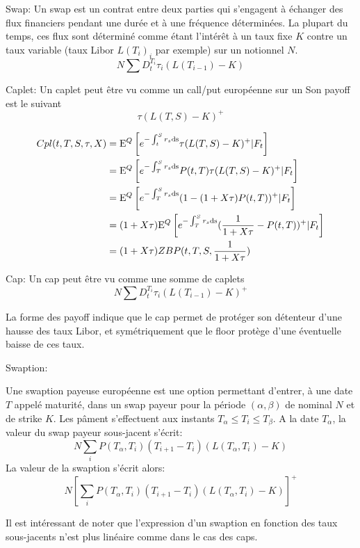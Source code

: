 \begin{defn}
  Swap:
Un swap est un contrat entre deux parties qui s'engagent à échanger des flux financiers pendant une durée et à une fréquence déterminées. La plupart du temps, ces flux sont déterminé comme étant l'intérêt à un taux fixe $K$ contre un taux variable (taux Libor ${L(T_i)}_i$ par exemple) sur un notionnel $N$. 
$$ N \sum D_t^{T_i} \tau_i (L(T_{i-1}) - K) $$
\end{defn}


\begin{defn}
  Caplet:
  Un caplet peut être vu comme un call/put européenne sur un
  Son payoff est le suivant
$$ \tau (L(T, S) - K)^+ $$
\end{defn}

\begin{align}
  Cpl(t, T, S, \tau, X)
  &= \mathrm{E}^Q \left[  e^{-\int_t^S r_s \rm{d}s} \tau (L(T, S) - K)^+ | F_t \right] \\ 
  &= \mathrm{E}^Q \left[  e^{-\int_T^S r_s \rm{d}s} P(t, T)  \tau (L(T, S) - K)^+ | F_t \right] \\
  &= \mathrm{E}^Q \left[  e^{-\int_T^S r_s \rm{d}s} (1 - (1 + X \tau)P(t, T))^+ | F_t \right] \\
  &= (1 + X \tau) \mathrm{E}^Q \left[  e^{-\int_T^S r_s \rm{d}s} (\frac{1}{1 + X \tau} - P(t, T))^+ | F_t \right] \\
  &= (1+X \tau) ZBP(t, T, S, \frac{1}{1+X \tau})
\end{align}

\begin{defn}
  Cap:
Un cap peut être vu comme une somme de caplets
$$ N \sum D_t^{T_i} \tau_i (L(T_{i-1}) - K)^+ $$
\end{defn}

La forme des payoff indique que le cap permet de protéger son détenteur d’une hausse des taux Libor, et symétriquement que le floor protège d’une éventuelle baisse de ces taux.

\begin{defn}
  Swaption:

 Une swaption payeuse européenne est une option permettant d’entrer, à une date $T$ appelé maturité, dans un swap payeur pour la période $(\alpha, \beta)$ de nominal $N$ et de strike $K$. 
 Les pâment s'effectuent aux instants $T_{\alpha} \leq T_i \leq T_{\beta}$. A la date $T_\alpha$, la valeur du swap payeur sous-jacent s'écrit:
$$ N \sum_{i} P(T_{\alpha}, T_i) (T_{i+1} - T_i) \left(L(T_{\alpha}, T_i) - K \right)$$
La valeur de la swaption s'écrit alors:
$$ N \left[ \sum_{i} P(T_{\alpha}, T_i) (T_{i+1} - T_i) \left(L(T_{\alpha}, T_i) - K \right) \right]^+$$
  
\end{defn}

Il est intéressant de noter que l'expression d'un swaption en fonction des taux sous-jacents n'est plus linéaire comme dans le cas des caps. 

